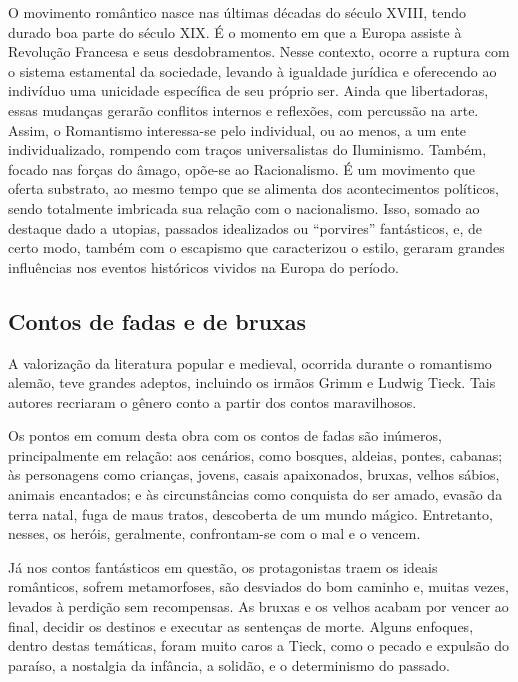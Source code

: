 \documentclass[12pt]{extarticle}
\begin{document}
O movimento romântico nasce nas últimas décadas do século XVIII, tendo
durado boa parte do século XIX. É o momento em que a Europa assiste à
Revolução Francesa e seus desdobramentos. Nesse contexto, ocorre a
ruptura com o sistema estamental da sociedade, levando à igualdade
jurídica e oferecendo ao indivíduo uma unicidade específica de seu
próprio ser. Ainda que libertadoras, essas mudanças gerarão conflitos
internos e reflexões, com percussão na arte. Assim, o Romantismo
interessa-se pelo individual, ou ao menos, a um ente individualizado,
rompendo com traços universalistas do Iluminismo. Também, focado nas
forças do âmago, opõe-se ao Racionalismo. É um movimento que oferta
substrato, ao mesmo tempo que se alimenta dos acontecimentos políticos,
sendo totalmente imbricada sua relação com o nacionalismo. Isso, somado
ao destaque dado a utopias, passados idealizados ou ``porvires''
fantásticos, e, de certo modo, também com o escapismo que caracterizou o
estilo, geraram grandes influências nos eventos históricos vividos na
Europa do período.

\subsection{Contos de fadas e de bruxas}

A valorização da literatura popular e medieval, ocorrida durante o
romantismo alemão, teve grandes adeptos, incluindo os irmãos Grimm e
Ludwig Tieck. Tais autores recriaram o gênero conto a partir dos contos
maravilhosos.

Os pontos em comum desta obra com os contos de fadas são inúmeros,
principalmente em relação: aos cenários, como bosques, aldeias, pontes,
cabanas; às personagens como crianças, jovens, casais apaixonados,
bruxas, velhos sábios, animais encantados; e às circunstâncias como
conquista do ser amado, evasão da terra natal, fuga de maus tratos,
descoberta de um mundo mágico. Entretanto, nesses, os heróis,
geralmente, confrontam-se com o mal e o vencem.

Já nos contos fantásticos em questão, os protagonistas traem os ideais
românticos, sofrem metamorfoses, são desviados do bom caminho e, muitas
vezes, levados à perdição sem recompensas. As bruxas e os velhos acabam
por vencer ao final, decidir os destinos e executar as sentenças de
morte. Alguns enfoques, dentro destas temáticas, foram muito caros a
Tieck, como o pecado e expulsão do paraíso, a nostalgia da infância, a
solidão, e o determinismo do passado.

\end{document}
